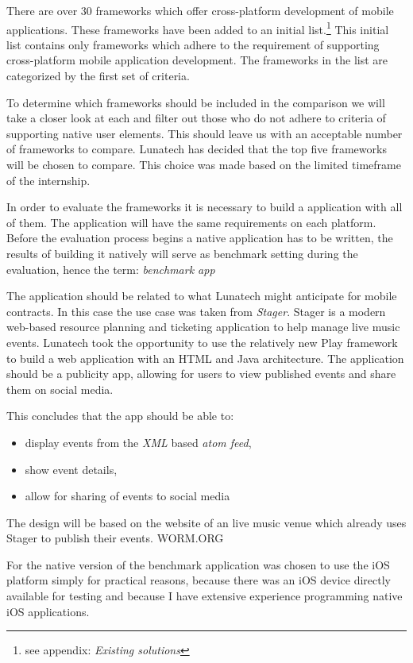 There are over 30 frameworks which offer cross-platform development of mobile applications\cite{Wikipedia2012}. These frameworks have been added to an initial list.\footnote{see appendix: \emph{Existing solutions}} This initial list contains only frameworks which adhere to the requirement of supporting cross-platform mobile application development. The frameworks in the list are categorized by the first set of criteria.

To determine which frameworks should be included in the comparison we will take a closer look at each and filter out those who do not adhere to criteria of supporting native user elements. This should leave us with an acceptable number of frameworks to compare. Lunatech has decided that the top five frameworks will be chosen to compare. This choice was made based on the limited timeframe of the internship.



In order to evaluate the frameworks it is necessary to build a application with all of them. The application will have the same requirements on each platform. Before the evaluation process begins a native application has to be written, the results of building it natively will serve as benchmark setting during the evaluation, hence the term: \emph{benchmark app}

The application should be related to what Lunatech might anticipate for mobile contracts. In this case the use case was taken from \emph{Stager}. Stager is a modern web-based resource planning and ticketing application to help manage live music events. Lunatech took the opportunity to use the relatively new Play framework to build a web application with an HTML and Java architecture. The application should be a publicity app, allowing for users to view published events and share them on social media.

This concludes that the app should be able to:
\begin{itemize}
	\item display events from the \emph{XML} based \emph{atom feed},
	\item show event details,
	\item allow for sharing of events to social media
\end{itemize}
The design will be based on the website of an live music venue which already uses Stager to publish their events. WORM.ORG

For the native version of the benchmark application was chosen to use the iOS platform simply for practical reasons, because there was an iOS device directly available for testing and because I have extensive experience programming native iOS applications.


